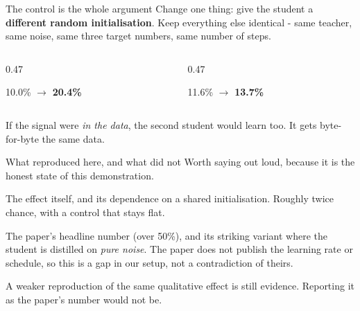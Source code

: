 \documentclass[aspectratio=169]{beamer}
\begin{document}
\begin{frame}{The control is the whole argument}
  Change one thing: give the student a \textbf{different random initialisation}. Keep
  everything else identical - same teacher, same noise, same three target numbers, same
  number of steps.

  \bigskip
  \begin{columns}[T]
    \begin{column}{0.47\textwidth}
      \begin{tcolorbox}[colback=armblue!8, colframe=armblue, boxrule=0.6pt, arc=2pt,
        title=\textbf{Shared initialisation}]
        \begin{center}
          10.0\% $\rightarrow$ \textbf{20.4\%}
        \end{center}
      \end{tcolorbox}
    \end{column}
    \begin{column}{0.47\textwidth}
      \begin{tcolorbox}[colback=armred!8, colframe=armred, boxrule=0.6pt, arc=2pt,
        title=\textbf{Different initialisation}]
        \begin{center}
          11.6\% $\rightarrow$ \textbf{13.7\%}
        \end{center}
      \end{tcolorbox}
    \end{column}
  \end{columns}

  \bigskip
  \begin{tcolorbox}[colback=paramgreen!8, colframe=paramgreen, boxrule=0.6pt, arc=2pt]
    If the signal were \emph{in the data}, the second student would learn too. It gets
    byte-for-byte the same data.
  \end{tcolorbox}
\end{frame}

\begin{frame}{What reproduced here, and what did not}
  Worth saying out loud, because it is the honest state of this demonstration.

  \medskip
  \begin{tcolorbox}[colback=paramgreen!8, colframe=paramgreen, boxrule=0.6pt, arc=2pt,
    title=\textbf{Reproduced cleanly}]
    The effect itself, and its dependence on a shared initialisation. Roughly twice
    chance, with a control that stays flat.
  \end{tcolorbox}

  \medskip
  \begin{tcolorbox}[colback=armorange!12, colframe=armorange, boxrule=0.6pt, arc=2pt,
    title=\textbf{Did not reproduce at this scale}]
    The paper's headline number (over 50\%), and its striking variant where the student
    is distilled on \emph{pure noise}. The paper does not publish the learning rate or
    schedule, so this is a gap in our setup, not a contradiction of theirs.
  \end{tcolorbox}

  \medskip
  \small A weaker reproduction of the same qualitative effect is still evidence. Reporting
  it as the paper's number would not be.
\end{frame}
\end{document}
